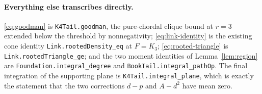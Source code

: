 \documentclass[11pt]{article}
\begin{document}
\paragraph{Everything else transcribes directly.}
\eqref{eq:goodman} is \texttt{K4Tail.goodman}, the pure-chordal clique bound at
$r=3$ extended below the threshold by nonnegativity; \eqref{eq:link-identity} is
the existing cone identity \texttt{Link.rootedDensity\_eq} at $F=K_3$;
\eqref{eq:rooted-triangle} is \texttt{Link.rootedTriangle\_ge}; and the two
moment identities of Lemma~\ref{lem:region} are \texttt{Foundation.integral\_degree}
and \texttt{BookTail.integral\_pathOp}.  The final integration of the supporting
plane is \texttt{K4Tail.integral\_plane}, which is exactly the statement that the
two corrections $d-p$ and $A-d^2$ have mean zero.
\end{document}

